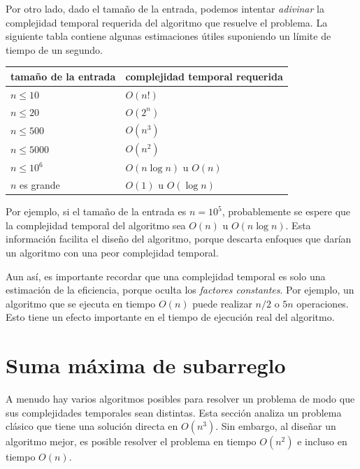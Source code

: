 Por otro lado, dado el tamaño de la entrada,
podemos intentar \emph{adivinar}
la complejidad temporal requerida del algoritmo
que resuelve el problema.
La siguiente tabla contiene algunas estimaciones útiles
suponiendo un límite de tiempo de un segundo.

\begin{center}
\begin{tabular}{ll}
tamaño de la entrada & complejidad temporal requerida \\
\hline
$n \le 10$ & $O(n!)$ \\
$n \le 20$ & $O(2^n)$ \\
$n \le 500$ & $O(n^3)$ \\
$n \le 5000$ & $O(n^2)$ \\
$n \le 10^6$ & $O(n \log n)$ u $O(n)$ \\
$n$ es grande & $O(1)$ u $O(\log n)$ \\
\end{tabular}
\end{center}

Por ejemplo, si el tamaño de la entrada es $n=10^5$,
probablemente se espere que la complejidad
temporal del algoritmo sea $O(n)$ u $O(n \log n)$.
Esta información facilita el diseño del algoritmo,
porque descarta enfoques que darían
un algoritmo con una peor complejidad temporal.


Aun así, es importante recordar que una
complejidad temporal es solo una estimación de la eficiencia,
porque oculta los \emph{factores constantes}.
Por ejemplo, un algoritmo que se ejecuta en tiempo $O(n)$
puede realizar $n/2$ o $5n$ operaciones.
Esto tiene un efecto importante en el tiempo de
ejecución real del algoritmo.

\section{Suma máxima de subarreglo}


A menudo hay varios algoritmos posibles
para resolver un problema de modo que sus
complejidades temporales sean distintas.
Esta sección analiza un problema clásico que
tiene una solución directa en $O(n^3)$.
Sin embargo, al diseñar un algoritmo mejor, es
posible resolver el problema en tiempo $O(n^2)$
e incluso en tiempo $O(n)$.

